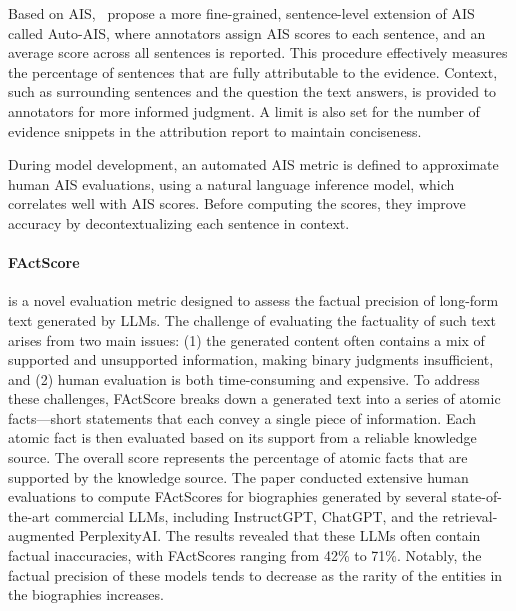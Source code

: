 Based on AIS,~\citet{gao2023rarr} propose a more fine-grained, sentence-level extension of AIS called Auto-AIS, where annotators assign AIS scores to each sentence, and an average score across all sentences is reported. This procedure effectively measures the percentage of sentences that are fully attributable to the evidence. Context, such as surrounding sentences and the question the text answers, is provided to annotators for more informed judgment. A limit is also set for the number of evidence snippets in the attribution report to maintain conciseness.

During model development, an automated AIS metric is defined to approximate human AIS evaluations, using a natural language inference model, which correlates well with AIS scores. Before computing the scores, they improve accuracy by decontextualizing each sentence in context. 

\paragraph{FActScore} \citep{Min2023-FActScore} is a novel evaluation metric designed to assess the factual precision of long-form text generated by LLMs. The challenge of evaluating the factuality of such text arises from two main issues: (1) the generated content often contains a mix of supported and unsupported information, making binary judgments insufficient, and (2) human evaluation is both time-consuming and expensive.
To address these challenges, FActScore breaks down a generated text into a series of atomic facts—short statements that each convey a single piece of information. Each atomic fact is then evaluated based on its support from a reliable knowledge source. The overall score represents the percentage of atomic facts that are supported by the knowledge source.
The paper conducted extensive human evaluations to compute FActScores for biographies generated by several state-of-the-art commercial LLMs, including InstructGPT, ChatGPT, and the retrieval-augmented PerplexityAI. The results revealed that these LLMs often contain factual inaccuracies, with FActScores ranging from 42\% to 71\%. Notably, the factual precision of these models tends to decrease as the rarity of the entities in the biographies increases.




